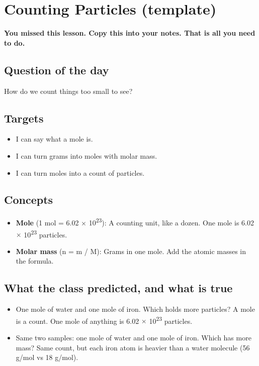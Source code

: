 \documentclass[11pt]{article}
\begin{document}
\section*{Counting Particles (template)}
\textbf{You missed this lesson. Copy this into your notes. That is all you need to do.}\par\medskip
\subsection*{Question of the day}
How do we count things too small to see?\par
\subsection*{Targets}\begin{itemize}\item I can say what a mole is.
\item I can turn grams into moles with molar mass.
\item I can turn moles into a count of particles.\end{itemize}
\subsection*{Concepts}\begin{itemize}
\item \textbf{Mole} (1 mol = 6.02 $\times$ 10\textsuperscript{2}\textsuperscript{3}): A counting unit, like a dozen. One mole is 6.02 $\times$ 10\textsuperscript{2}\textsuperscript{3} particles.
\item \textbf{Molar mass} (n = m / M): Grams in one mole. Add the atomic masses in the formula.
\end{itemize}
\subsection*{What the class predicted, and what is true}\begin{itemize}
\item One mole of water and one mole of iron. Which holds more particles?  A mole is a count. One mole of anything is 6.02 $\times$ 10\textsuperscript{2}\textsuperscript{3} particles.
\item Same two samples: one mole of water and one mole of iron. Which has more mass?  Same count, but each iron atom is heavier than a water molecule (56 g/mol vs 18 g/mol).
\end{itemize}
\end{document}
